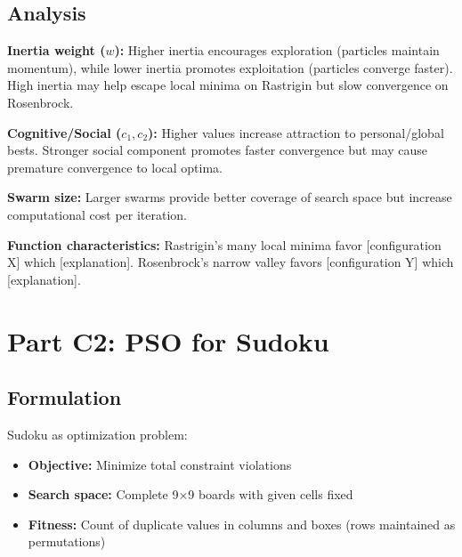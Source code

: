 \documentclass[letterpaper]{article}
\begin{document}
\subsection{Analysis}


\textbf{Inertia weight ($w$):} Higher inertia encourages exploration (particles maintain momentum), while lower inertia promotes exploitation (particles converge faster). High inertia may help escape local minima on Rastrigin but slow convergence on Rosenbrock.

\textbf{Cognitive/Social ($c_1, c_2$):} Higher values increase attraction to personal/global bests. Stronger social component promotes faster convergence but may cause premature convergence to local optima.

\textbf{Swarm size:} Larger swarms provide better coverage of search space but increase computational cost per iteration.

\textbf{Function characteristics:} Rastrigin's many local minima favor [configuration X] which [explanation]. Rosenbrock's narrow valley favors [configuration Y] which [explanation].


\section{Part C2: PSO for Sudoku}

\subsection{Formulation}

Sudoku as optimization problem:
\begin{itemize}
\item \textbf{Objective:} Minimize total constraint violations
\item \textbf{Search space:} Complete 9×9 boards with given cells fixed
\item \textbf{Fitness:} Count of duplicate values in columns and boxes (rows maintained as permutations)
\end{itemize}
\end{document}

